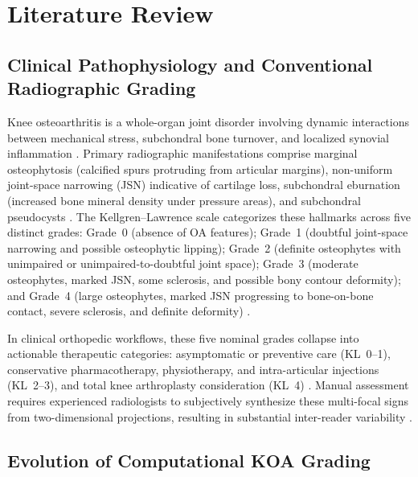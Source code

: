 \documentclass[10pt,journal]{IEEEtran}
\begin{document}
\section{Literature Review}
\label{sec:literature}

\subsection{Clinical Pathophysiology and Conventional Radiographic Grading}
\label{subsec:clinical_background}

Knee osteoarthritis is a whole-organ joint disorder involving dynamic interactions between mechanical stress, subchondral bone turnover, and localized synovial inflammation \cite{loeser2012oa, hunter2019oa}. Primary radiographic manifestations comprise marginal osteophytosis (calcified spurs protruding from articular margins), non-uniform joint-space narrowing (JSN) indicative of cartilage loss, subchondral eburnation (increased bone mineral density under pressure areas), and subchondral pseudocysts \cite{braun2012diagnosis}. The Kellgren--Lawrence scale categorizes these hallmarks across five distinct grades: Grade~0 (absence of OA features); Grade~1 (doubtful joint-space narrowing and possible osteophytic lipping); Grade~2 (definite osteophytes with unimpaired or unimpaired-to-doubtful joint space); Grade~3 (moderate osteophytes, marked JSN, some sclerosis, and possible bony contour deformity); and Grade~4 (large osteophytes, marked JSN progressing to bone-on-bone contact, severe sclerosis, and definite deformity) \cite{kellgren1957radiological}.

In clinical orthopedic workflows, these five nominal grades collapse into actionable therapeutic categories: asymptomatic or preventive care (KL~0--1), conservative pharmacotherapy, physiotherapy, and intra-articular injections (KL~2--3), and total knee arthroplasty consideration (KL~4) \cite{zhang2010eular, carr2012knee}. Manual assessment requires experienced radiologists to subjectively synthesize these multi-focal signs from two-dimensional projections, resulting in substantial inter-reader variability \cite{schiphof2008differences, wright2014interobserver}.

\subsection{Evolution of Computational KOA Grading}
\label{subsec:evolution}
\end{document}
